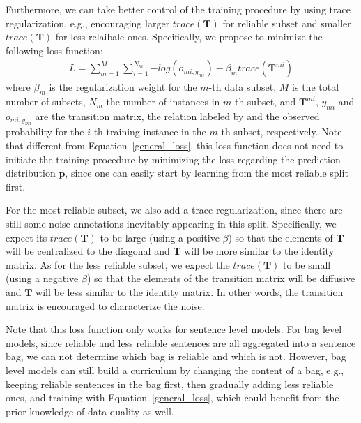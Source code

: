 Furthermore, we can take better control of the training procedure by using trace regularization, e.g., encouraging larger $trace (\mathbf{T})$ for reliable subset and smaller $trace (\mathbf{T})$ for less relaibale ones.
Specifically, we propose to minimize the following  loss function:
%
\begin{equation}
\begin{aligned}
L=\sum_{m=1}^M{\sum_{i=1}^{N_m}{-log(o_{mi,y_{mi}})}} - \beta_m trace(\mathbf{T}^{mi})
\end{aligned}
\end{equation}
where $\beta_m$ is the regularization weight for the $m$-th data subset, $M$ is the total number of subsets, $N_m$ the number of instances in $m$-th subset, and  $\mathbf{T}^{mi}$, $y_{mi}$ and $o_{mi,y_{mi}}$ are the transition matrix, the relation labeled by \DS and the observed probability for the $i$-th training instance in the $m$-th subset, respectively. Note that different from Equation~\ref{general_loss}, this loss function does not need to initiate the training procedure by
minimizing the loss regarding the prediction distribution $\mathbf{p}$, since one can easily start by learning from the most reliable split first. 


For the most reliable subset, we also add a trace regularization, since there are still some noise annotations inevitably appearing in this split. 
Specifically, we expect its $trace(\mathbf{T})$ to be large (using a positive $\beta$) so that the elements of $\mathbf{T}$ will be centralized to the diagonal and $\mathbf{T}$ will be more similar to the identity matrix. As for the  less reliable subset, we expect the $trace (\mathbf{T})$ to be small (using a negative $\beta$) so that the elements of the transition matrix will be diffusive and $\mathbf{T}$  will be less similar to the identity matrix. In other words, the transition matrix is encouraged to characterize the noise.

Note that this loss function only works for sentence level models. For bag level models, since reliable and less reliable sentences are all aggregated into a sentence bag,  we can not determine which bag is reliable and which is not. However, bag level models can still build a curriculum by changing the content of a bag, e.g., keeping reliable sentences in the bag first, then gradually adding less reliable ones, and training with Equation~\ref{general_loss}, which could benefit from the prior knowledge of data quality as well.



